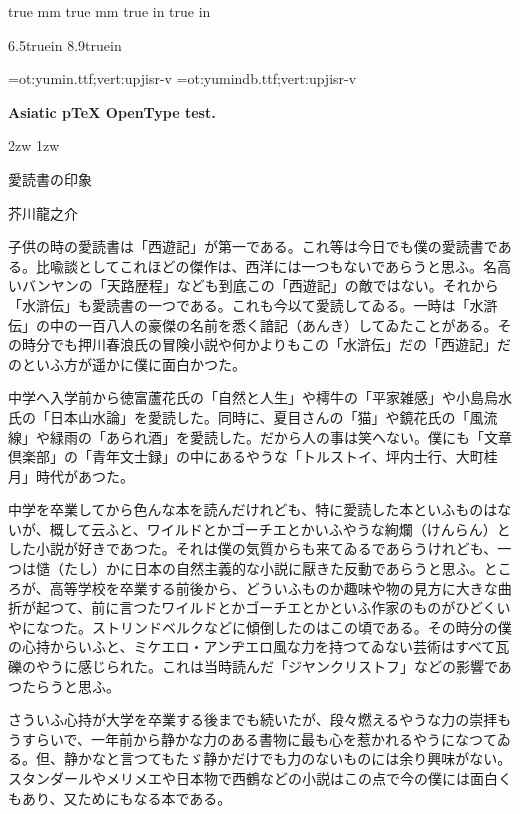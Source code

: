  true mm
 true mm
 true in
 true in

\tate%
{}

\iftdir
  \vsize6.5truein
  \hsize8.9truein
\fi

\tfont\yumin=ot:yumin.ttf;vert:upjisr-v
\tfont\yumindb=ot:yumindb.ttf;vert:upjisr-v
{{\noindent\yumin\bf Asiatic {p\TeX} OpenType test.\par}}

\yumin
\parindent2zw
\parskip1zw

\centerline{\yumindb 愛読書の印象}
\centerline{\yumindb 芥川龍之介}

\bigskip

子供の時の愛読書は「西遊記」が第一である。これ等は今日でも僕の愛読書である。比喩談としてこれほどの傑作は、西洋には一つもないであらうと思ふ。名高いバンヤンの「天路歴程」なども到底この「西遊記」の敵ではない。それから「水滸伝」も愛読書の一つである。これも今以て愛読してゐる。一時は「水滸伝」の中の一百八人の豪傑の名前を悉く諳記（あんき）してゐたことがある。その時分でも押川春浪氏の冒険小説や何かよりもこの「水滸伝」だの「西遊記」だのといふ方が遥かに僕に面白かつた。

中学へ入学前から徳富蘆花氏の「自然と人生」や樗牛の「平家雑感」や小島烏水氏の「日本山水論」を愛読した。同時に、夏目さんの「猫」や鏡花氏の「風流線」や緑雨の「あられ酒」を愛読した。だから人の事は笑へない。僕にも「文章倶楽部」の「青年文士録」の中にあるやうな「トルストイ、坪内士行、大町桂月」時代があつた。

中学を卒業してから色んな本を読んだけれども、特に愛読した本といふものはないが、概して云ふと、ワイルドとかゴーチエとかいふやうな絢爛（けんらん）とした小説が好きであつた。それは僕の気質からも来てゐるであらうけれども、一つは慥（たし）かに日本の自然主義的な小説に厭きた反動であらうと思ふ。ところが、高等学校を卒業する前後から、どういふものか趣味や物の見方に大きな曲折が起つて、前に言つたワイルドとかゴーチエとかといふ作家のものがひどくいやになつた。ストリンドベルクなどに傾倒したのはこの頃である。その時分の僕の心持からいふと、ミケエロ・アンヂエロ風な力を持つてゐない芸術はすべて瓦礫のやうに感じられた。これは当時読んだ「ジヤンクリストフ」などの影響であつたらうと思ふ。

さういふ心持が大学を卒業する後までも続いたが、段々燃えるやうな力の崇拝もうすらいで、一年前から静かな力のある書物に最も心を惹かれるやうになつてゐる。但、静かなと言つてもたゞ静かだけでも力のないものには余り興味がない。スタンダールやメリメエや日本物で西鶴などの小説はこの点で今の僕には面白くもあり、又ためにもなる本である。

